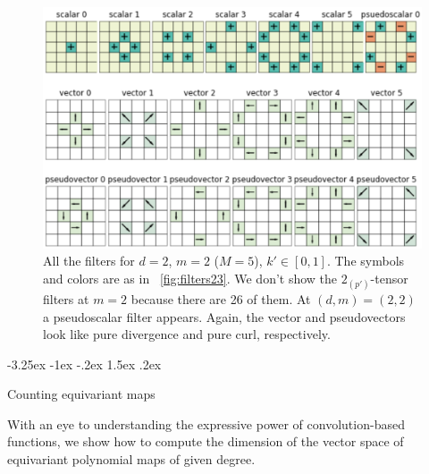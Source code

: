 \documentclass{article}
\makeatletter
\newenvironment{hoggfigure}{%
  \begin{figure}[tp]%
    \begin{mdframed}%
    \color{captiongray}}{%
    \end{mdframed}%
  \end{figure}}
\theoremstyle{definition}
\newcommand{\tensorname}[2]{{#1}_{(#2)}}
\newcommand{\tensor}[2]{$\tensorname{#1}{#2}$-tensor}
\newcommand{\figref}[1]{\figurename~\ref{#1}}
\renewcommand\section{\@startsection {section}{1}{\z@}%
  {-3.25ex \@plus -1ex \@minus -.2ex}%
  {1.5ex \@plus .2ex}%
  {\raggedright\normalfont\large\bfseries}}%
\makeatother
\begin{document}
\begin{hoggfigure}
  \begin{center}
    \includegraphics[width=\textwidth]{pics/filters_m5.png}
  \end{center}
\caption{All the filters for $d=2$, $m=2$ ($M=5$), $k'\in [0,1]$.
The symbols and colors are as in \figref{fig:filters23}.
We don't show the \tensor{2}{p'} filters at $m=2$ because there are 26 of them.
At $(d,m)=(2,2)$ a pseudoscalar filter appears.
Again, the vector and pseudovectors look like pure divergence and pure curl, respectively.\label{fig:filters25}}
\end{hoggfigure}


\section{Counting equivariant maps}

With an eye to understanding the expressive power of convolution-based functions, we show how to compute the dimension of the vector space of equivariant polynomial maps of given degree.
\end{document}
